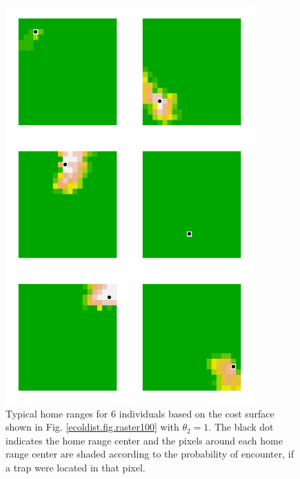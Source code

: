 \documentclass[12pt]{article}
\begin{document}
\newpage



\begin{figure}
\begin{center}
\includegraphics[height=6in,width=3.75in]{figs/home_ranges}
\end{center}
\caption{
Typical home ranges for 6 individuals based on the cost surface shown in
  Fig. \ref{ecoldist.fig.raster100} with $\theta_{2}=1$. The black dot indicates the home
  range center and the pixels around each home range center are shaded
according to the probability of encounter, if a trap were located in
that pixel.
}
\label{fig.homeranges}
\end{figure}


\newpage
\end{document}

